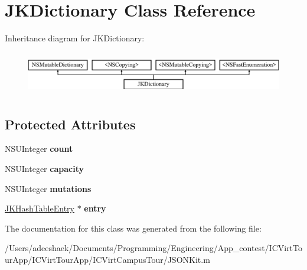 \hypertarget{interface_j_k_dictionary}{\section{J\-K\-Dictionary Class Reference}
\label{interface_j_k_dictionary}
}
Inheritance diagram for J\-K\-Dictionary\-:\begin{figure}[H]
\begin{center}
\leavevmode
\includegraphics[height=1.931034cm]{interface_j_k_dictionary}
\end{center}
\end{figure}
\subsection*{Protected Attributes}
\begin{DoxyCompactItemize}
\item 
\hypertarget{interface_j_k_dictionary_ac968acbdbe8558802740546df937c12e}{N\-S\-U\-Integer {\bfseries count}}\label{interface_j_k_dictionary_ac968acbdbe8558802740546df937c12e}

\item 
\hypertarget{interface_j_k_dictionary_a0c0489633856e73ce1be1ea4a53e59e5}{N\-S\-U\-Integer {\bfseries capacity}}\label{interface_j_k_dictionary_a0c0489633856e73ce1be1ea4a53e59e5}

\item 
\hypertarget{interface_j_k_dictionary_aad877b0b159760efefe926a6613dcd5e}{N\-S\-U\-Integer {\bfseries mutations}}\label{interface_j_k_dictionary_aad877b0b159760efefe926a6613dcd5e}

\item 
\hypertarget{interface_j_k_dictionary_aa709920f66876de1d7ddf0654901829b}{\hyperlink{struct_j_k_hash_table_entry}{J\-K\-Hash\-Table\-Entry} $\ast$ {\bfseries entry}}\label{interface_j_k_dictionary_aa709920f66876de1d7ddf0654901829b}

\end{DoxyCompactItemize}


The documentation for this class was generated from the following file\-:\begin{DoxyCompactItemize}
\item 
/\-Users/adeeshaek/\-Documents/\-Programming/\-Engineering/\-App\-\_\-contest/\-I\-C\-Virt\-Tour\-App/\-I\-C\-Virt\-Tour\-App/\-I\-C\-Virt\-Campus\-Tour/J\-S\-O\-N\-Kit.\-m\end{DoxyCompactItemize}
